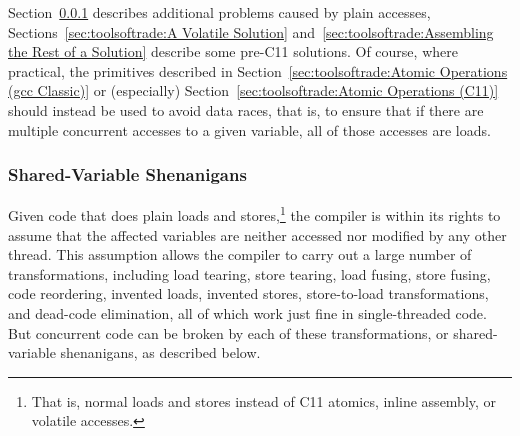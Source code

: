 \QuickQuizEnd

Section~\ref{sec:toolsoftrade:Shared-Variable Shenanigans}
describes additional problems caused by plain accesses,
Sections~\ref{sec:toolsoftrade:A Volatile Solution}
and~\ref{sec:toolsoftrade:Assembling the Rest of a Solution}
describe some pre-C11 solutions.
Of course, where practical, the primitives described in
Section~\ref{sec:toolsoftrade:Atomic Operations (gcc Classic)}
or (especially)
Section~\ref{sec:toolsoftrade:Atomic Operations (C11)}
should instead be used to avoid data races, that is, to ensure
that if there are multiple concurrent accesses to a given
variable, all of those accesses are loads.

\subsubsection{Shared-Variable Shenanigans}
\label{sec:toolsoftrade:Shared-Variable Shenanigans}
%
Given code that does plain loads and stores,\footnote{
	That is, normal loads and stores instead of C11 atomics, inline
	assembly, or volatile accesses.}
the compiler is within
its rights to assume that the affected variables are neither accessed
nor modified by any other thread.
This assumption allows the compiler to carry out a large number of
transformations, including load tearing, store tearing,
load fusing, store fusing, code reordering, invented loads,
invented stores, store-to-load transformations, and dead-code elimination,
all of which work just fine in single-threaded code.
But concurrent code can be broken by each of these transformations,
or shared-variable shenanigans, as described below.

